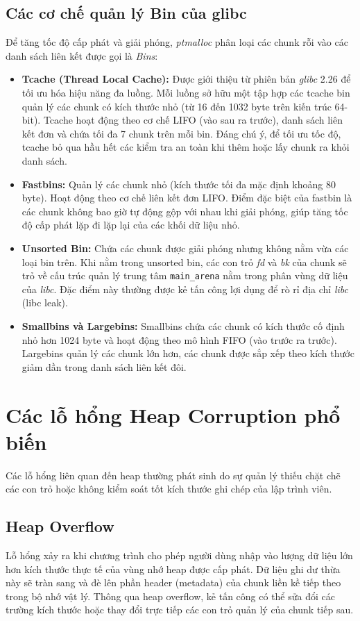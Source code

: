 \documentclass[final]{hcmuitthesis}
\begin{document}
\subsection{Các cơ chế quản lý Bin của glibc}
Để tăng tốc độ cấp phát và giải phóng, \textit{ptmalloc} phân loại các chunk rỗi vào các danh sách liên kết được gọi là \textit{Bins}:
\begin{itemize}
    \item \textbf{Tcache (Thread Local Cache):} Được giới thiệu từ phiên bản \textit{glibc} 2.26 để tối ưu hóa hiệu năng đa luồng. Mỗi luồng sở hữu một tập hợp các tcache bin quản lý các chunk có kích thước nhỏ (từ 16 đến 1032 byte trên kiến trúc 64-bit). Tcache hoạt động theo cơ chế LIFO (vào sau ra trước), danh sách liên kết đơn và chứa tối đa 7 chunk trên mỗi bin. Đáng chú ý, để tối ưu tốc độ, tcache bỏ qua hầu hết các kiểm tra an toàn khi thêm hoặc lấy chunk ra khỏi danh sách.
    \item \textbf{Fastbins:} Quản lý các chunk nhỏ (kích thước tối đa mặc định khoảng 80 byte). Hoạt động theo cơ chế liên kết đơn LIFO. Điểm đặc biệt của fastbin là các chunk không bao giờ tự động gộp với nhau khi giải phóng, giúp tăng tốc độ cấp phát lặp đi lặp lại của các khối dữ liệu nhỏ.
    \item \textbf{Unsorted Bin:} Chứa các chunk được giải phóng nhưng không nằm vừa các loại bin trên. Khi nằm trong unsorted bin, các con trỏ \textit{fd} và \textit{bk} của chunk sẽ trỏ về cấu trúc quản lý trung tâm \texttt{main\_arena} nằm trong phân vùng dữ liệu của \textit{libc}. Đặc điểm này thường được kẻ tấn công lợi dụng để rò rỉ địa chỉ \textit{libc} (libc leak).
    \item \textbf{Smallbins và Largebins:} Smallbins chứa các chunk có kích thước cố định nhỏ hơn 1024 byte và hoạt động theo mô hình FIFO (vào trước ra trước). Largebins quản lý các chunk lớn hơn, các chunk được sắp xếp theo kích thước giảm dần trong danh sách liên kết đôi.
\end{itemize}

\section{Các lỗ hổng Heap Corruption phổ biến}
Các lỗ hổng liên quan đến heap thường phát sinh do sự quản lý thiếu chặt chẽ các con trỏ hoặc không kiểm soát tốt kích thước ghi chép của lập trình viên.

\subsection{Heap Overflow}
Lỗ hổng xảy ra khi chương trình cho phép người dùng nhập vào lượng dữ liệu lớn hơn kích thước thực tế của vùng nhớ heap được cấp phát. Dữ liệu ghi dư thừa này sẽ tràn sang và đè lên phần header (metadata) của chunk liền kề tiếp theo trong bộ nhớ vật lý. Thông qua heap overflow, kẻ tấn công có thể sửa đổi các trường kích thước hoặc thay đổi trực tiếp các con trỏ quản lý của chunk tiếp sau.
\end{document}
